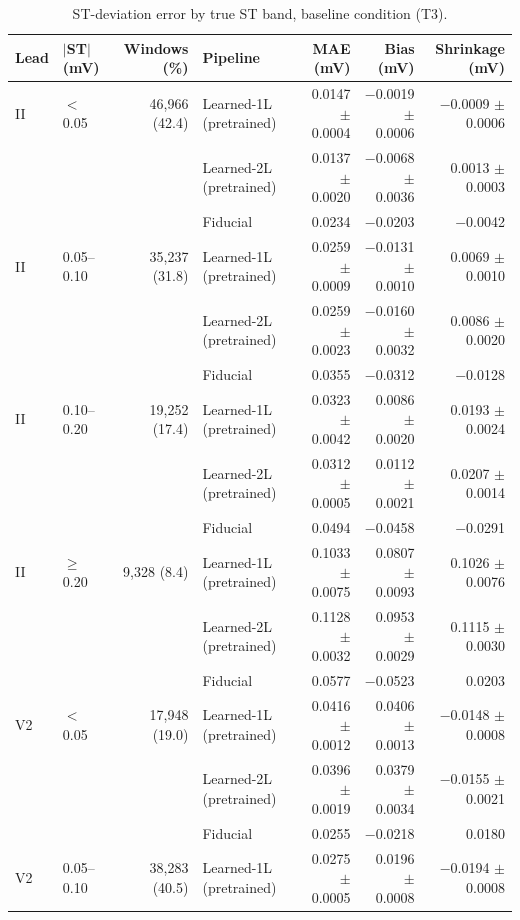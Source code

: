 \begin{table}[htbp]
\centering
\small
\caption{ST-deviation error by true ST band, baseline condition (T3).}
\label{tab:t3_bands}
\begin{tabular}{llrlrrr}
\toprule
Lead & $|$ST$|$ (mV) & Windows (\%) & Pipeline & MAE (mV) & Bias (mV) & Shrinkage (mV) \\
\midrule
II & $<$\,0.05 & 46{,}966 (42.4) & Learned-1L (pretrained) & 0.0147 $\pm$ 0.0004 & $-$0.0019 $\pm$ 0.0006 & $-$0.0009 $\pm$ 0.0006 \\
 &  &  & Learned-2L (pretrained) & 0.0137 $\pm$ 0.0020 & $-$0.0068 $\pm$ 0.0036 & 0.0013 $\pm$ 0.0003 \\
 &  &  & Fiducial & 0.0234 & $-$0.0203 & $-$0.0042 \\
II & 0.05--0.10 & 35{,}237 (31.8) & Learned-1L (pretrained) & 0.0259 $\pm$ 0.0009 & $-$0.0131 $\pm$ 0.0010 & 0.0069 $\pm$ 0.0010 \\
 &  &  & Learned-2L (pretrained) & 0.0259 $\pm$ 0.0023 & $-$0.0160 $\pm$ 0.0032 & 0.0086 $\pm$ 0.0020 \\
 &  &  & Fiducial & 0.0355 & $-$0.0312 & $-$0.0128 \\
II & 0.10--0.20 & 19{,}252 (17.4) & Learned-1L (pretrained) & 0.0323 $\pm$ 0.0042 & 0.0086 $\pm$ 0.0020 & 0.0193 $\pm$ 0.0024 \\
 &  &  & Learned-2L (pretrained) & 0.0312 $\pm$ 0.0005 & 0.0112 $\pm$ 0.0021 & 0.0207 $\pm$ 0.0014 \\
 &  &  & Fiducial & 0.0494 & $-$0.0458 & $-$0.0291 \\
II & $\geq$\,0.20 & 9{,}328 (8.4) & Learned-1L (pretrained) & 0.1033 $\pm$ 0.0075 & 0.0807 $\pm$ 0.0093 & 0.1026 $\pm$ 0.0076 \\
 &  &  & Learned-2L (pretrained) & 0.1128 $\pm$ 0.0032 & 0.0953 $\pm$ 0.0029 & 0.1115 $\pm$ 0.0030 \\
 &  &  & Fiducial & 0.0577 & $-$0.0523 & 0.0203 \\
\midrule
V2 & $<$\,0.05 & 17{,}948 (19.0) & Learned-1L (pretrained) & 0.0416 $\pm$ 0.0012 & 0.0406 $\pm$ 0.0013 & $-$0.0148 $\pm$ 0.0008 \\
 &  &  & Learned-2L (pretrained) & 0.0396 $\pm$ 0.0019 & 0.0379 $\pm$ 0.0034 & $-$0.0155 $\pm$ 0.0021 \\
 &  &  & Fiducial & 0.0255 & $-$0.0218 & 0.0180 \\
V2 & 0.05--0.10 & 38{,}283 (40.5) & Learned-1L (pretrained) & 0.0275 $\pm$ 0.0005 & 0.0196 $\pm$ 0.0008 & $-$0.0194 $\pm$ 0.0008 \\

\end{tabular}
\end{table}
